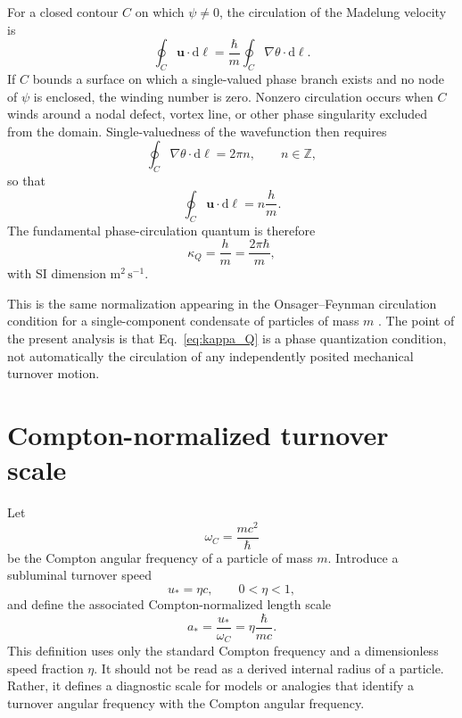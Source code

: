 \documentclass[11pt,a4paper]{article}
\newcommand{\dd}{\mathrm{d}}
\newcommand{\kappaQ}{\kappa_{Q}}
\newcommand{\omegaC}{\omega_{C}}
\newcommand{\uStar}{u_{*}}
\newcommand{\aStar}{a_{*}}
\begin{document}
For a closed contour $C$ on which $\psi\neq0$, the circulation of the Madelung velocity is
\begin{equation}
    \oint_C\mathbf{u}\cdot\dd\boldsymbol{\ell}
    =
    \frac{\hbar}{m}\oint_C\nabla\theta\cdot\dd\boldsymbol{\ell}.
\end{equation}
If $C$ bounds a surface on which a single-valued phase branch exists and no node of $\psi$ is enclosed, the winding number is zero. Nonzero circulation occurs when $C$ winds around a nodal defect, vortex line, or other phase singularity excluded from the domain. Single-valuedness of the wavefunction then requires
\begin{equation}
    \oint_C\nabla\theta\cdot\dd\boldsymbol{\ell}=2\pi n,
    \qquad n\in\mathbb{Z},
\end{equation}
so that
\begin{equation}
    \oint_C\mathbf{u}\cdot\dd\boldsymbol{\ell}
    =
    n\frac{h}{m}.
\end{equation}
The fundamental phase-circulation quantum is therefore
\begin{equation}
    \kappaQ=\frac{h}{m}=\frac{2\pi\hbar}{m},
    \label{eq:kappa_Q}
\end{equation}
with SI dimension $\mathrm{m^2\,s^{-1}}$.

This is the same normalization appearing in the Onsager--Feynman circulation condition for a single-component condensate of particles of mass $m$ \cite{Onsager1949,Feynman1955,Donnelly1991}. The point of the present analysis is that Eq.~\eqref{eq:kappa_Q} is a phase quantization condition, not automatically the circulation of any independently posited mechanical turnover motion.

\section{Compton-normalized turnover scale}

Let
\begin{equation}
    \omegaC=\frac{mc^2}{\hbar}
    \label{eq:omega_C}
\end{equation}
be the Compton angular frequency of a particle of mass $m$. Introduce a subluminal turnover speed
\begin{equation}
    \uStar=\eta c,
    \qquad 0<\eta<1,
    \label{eq:u_star}
\end{equation}
and define the associated Compton-normalized length scale
\begin{equation}
    \aStar=\frac{\uStar}{\omegaC}
    =
    \eta\frac{\hbar}{mc}.
    \label{eq:a_star}
\end{equation}
This definition uses only the standard Compton frequency and a dimensionless speed fraction $\eta$. It should not be read as a derived internal radius of a particle. Rather, it defines a diagnostic scale for models or analogies that identify a turnover angular frequency with the Compton angular frequency.
\end{document}
